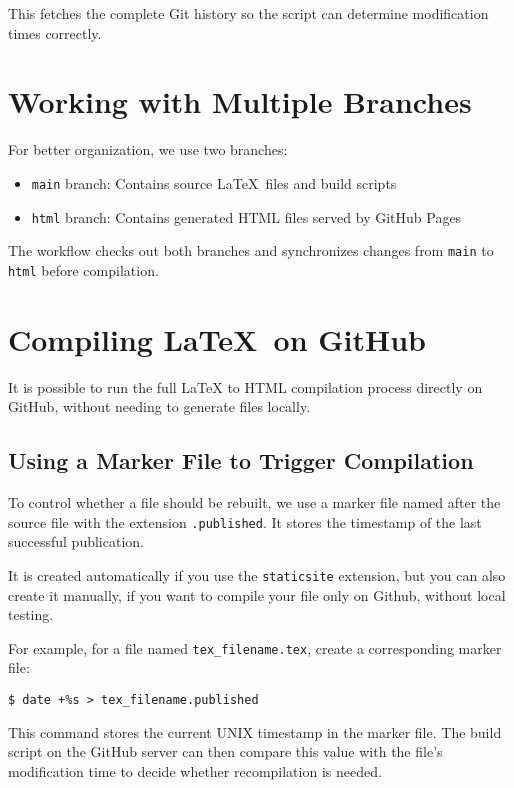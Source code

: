 \documentclass{article}
\begin{document}
This fetches the complete Git history so the script can determine modification times correctly.

\section{Working with Multiple Branches}

For better organization, we use two branches:
\begin{itemize}
  \item \texttt{main} branch: Contains source \LaTeX\ files and build scripts
  \item \texttt{html} branch: Contains generated HTML files served by GitHub Pages
\end{itemize}

The workflow checks out both branches and synchronizes changes from \texttt{main} to \texttt{html} before compilation.

\section{Compiling \LaTeX\ on GitHub}

It is possible to run the full \LaTeX{} to HTML compilation process directly on GitHub, 
without needing to generate files locally.

\subsection{Using a Marker File to Trigger Compilation}

To control whether a file should be rebuilt, we use a marker file named after the source file 
with the extension \texttt{.published}. It stores the timestamp of the last successful publication.

It is created automatically if you use the \texttt{staticsite} extension, but you can also create it manually,
if you want to compile your file only on Github, without local testing.

For example, for a file named \texttt{tex\_filename.tex}, create a corresponding marker file:

\begin{verbatim}
$ date +%s > tex_filename.published
\end{verbatim}

This command stores the current UNIX timestamp in the marker file. The build script 
on the GitHub server can then compare this value with the file's modification time 
to decide whether recompilation is needed.
\end{document}
